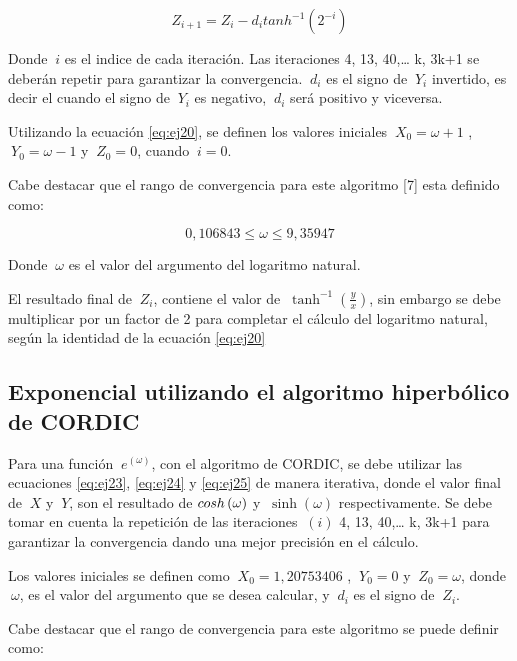 \begin{equation} \label{eq:ej25}
  Z_{i+1} = Z_{i} - d_{i} tanh^{-1}\left(2^{-i}\right)
\end{equation}

Donde $\ i $ es el indice de cada iteración. Las iteraciones 4, 13, 40,… k, 3k+1 se deberán repetir para garantizar la convergencia. $\ d_i $ es el signo de $\ Y_i $ invertido, es decir el cuando el signo de $\ Y_i $ es negativo, $\ d_i $ será positivo y viceversa.

Utilizando la ecuación \ref{eq:ej20}, se definen los valores iniciales   $\ X_0 = \omega + 1$ , $\ Y_0 = \omega - 1$ y $\ Z_0 = 0 $, cuando $\ i = 0 $.

Cabe destacar que el rango de convergencia para este algoritmo [7] esta definido como: 

\begin{equation} \label{eq:ej26}
   0,106843 \leq \omega \leq 9,35947
\end{equation}

Donde $\ \omega $ es el valor del argumento del logaritmo natural.

El resultado final de $\ Z_i $, contiene el valor de $\ \tanh^{-1} \left( \frac{y}{x} \right)$, sin embargo se debe multiplicar por un factor de 2 para completar el cálculo del logaritmo natural, según la identidad de la ecuación \ref{eq:ej20} 

\subsection{Exponencial utilizando el algoritmo hiperbólico de CORDIC }


Para una función  $\ e^{\left(\omega\right)} $, con el algoritmo de CORDIC, se debe utilizar las ecuaciones \ref{eq:ej23}, \ref{eq:ej24} y \ref{eq:ej25} de manera iterativa, donde el valor final de $\ X $ y $\ Y$, son el resultado de $\\cosh\left(\omega\right)$ y $\ \sinh\left(\omega\right)$ respectivamente. Se debe tomar en cuenta la repetición de las iteraciones $\ \left(i\right) $ 4, 13, 40,… k, 3k+1 para garantizar la convergencia dando una mejor precisión en el cálculo.

Los valores iniciales se definen como  $\ X_0 = 1,20753406 $ , $\ Y_0 = 0$ y $\ Z_0 = \omega $, donde $\ \omega$,  es el valor del argumento que se desea calcular, y $\ d_i $ es el signo de $\ Z_i $.

Cabe destacar que el rango de convergencia para este algoritmo se puede definir como: 

